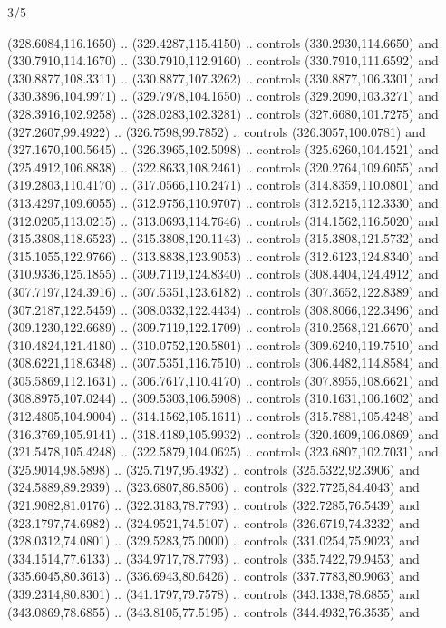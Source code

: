 \begin{flagdescription}{3/5}
\begin{scope}[xshift=0.5\flaglength,yshift=0.5\flagwidth,scale=\flagwidth/270]
\begin{scope}[y=0.8pt, x=0.8pt, yscale=-1,shift={(-281.25,-168.75)}]
  (328.6084,116.1650) .. (329.4287,115.4150) .. controls (330.2930,114.6650) and
  (330.7910,114.1670) .. (330.7910,112.9160) .. controls (330.7910,111.6592) and
  (330.8877,108.3311) .. (330.8877,107.3262) .. controls (330.8877,106.3301) and
  (330.3896,104.9971) .. (329.7978,104.1650) .. controls (329.2090,103.3271) and
  (328.3916,102.9258) .. (328.0283,102.3281) .. controls (327.6680,101.7275) and
  (327.2607,99.4922) .. (326.7598,99.7852) .. controls (326.3057,100.0781) and
  (327.1670,100.5645) .. (326.3965,102.5098) .. controls (325.6260,104.4521) and
  (325.4912,106.8838) .. (322.8633,108.2461) .. controls (320.2764,109.6055) and
  (319.2803,110.4170) .. (317.0566,110.2471) .. controls (314.8359,110.0801) and
  (313.4297,109.6055) .. (312.9756,110.9707) .. controls (312.5215,112.3330) and
  (312.0205,113.0215) .. (313.0693,114.7646) .. controls (314.1562,116.5020) and
  (315.3808,118.6523) .. (315.3808,120.1143) .. controls (315.3808,121.5732) and
  (315.1055,122.9766) .. (313.8838,123.9053) .. controls (312.6123,124.8340) and
  (310.9336,125.1855) .. (309.7119,124.8340) .. controls (308.4404,124.4912) and
  (307.7197,124.3916) .. (307.5351,123.6182) .. controls (307.3652,122.8389) and
  (307.2187,122.5459) .. (308.0332,122.4434) .. controls (308.8066,122.3496) and
  (309.1230,122.6689) .. (309.7119,122.1709) .. controls (310.2568,121.6670) and
  (310.4824,121.4180) .. (310.0752,120.5801) .. controls (309.6240,119.7510) and
  (308.6221,118.6348) .. (307.5351,116.7510) .. controls (306.4482,114.8584) and
  (305.5869,112.1631) .. (306.7617,110.4170) .. controls (307.8955,108.6621) and
  (308.8975,107.0244) .. (309.5303,106.5908) .. controls (310.1631,106.1602) and
  (312.4805,104.9004) .. (314.1562,105.1611) .. controls (315.7881,105.4248) and
  (316.3769,105.9141) .. (318.4189,105.9932) .. controls (320.4609,106.0869) and
  (321.5478,105.4248) .. (322.5879,104.0625) .. controls (323.6807,102.7031) and
  (325.9014,98.5898) .. (325.7197,95.4932) .. controls (325.5322,92.3906) and
  (324.5889,89.2939) .. (323.6807,86.8506) .. controls (322.7725,84.4043) and
  (321.9082,81.0176) .. (322.3183,78.7793) .. controls (322.7285,76.5439) and
  (323.1797,74.6982) .. (324.9521,74.5107) .. controls (326.6719,74.3232) and
  (328.0312,74.0801) .. (329.5283,75.0000) .. controls (331.0254,75.9023) and
  (334.1514,77.6133) .. (334.9717,78.7793) .. controls (335.7422,79.9453) and
  (335.6045,80.3613) .. (336.6943,80.6426) .. controls (337.7783,80.9063) and
  (339.2314,80.8301) .. (341.1797,79.7578) .. controls (343.1338,78.6855) and
  (343.0869,78.6855) .. (343.8105,77.5195) .. controls (344.4932,76.3535) and

\end{scope}
\end{scope}
\end{flagdescription}
